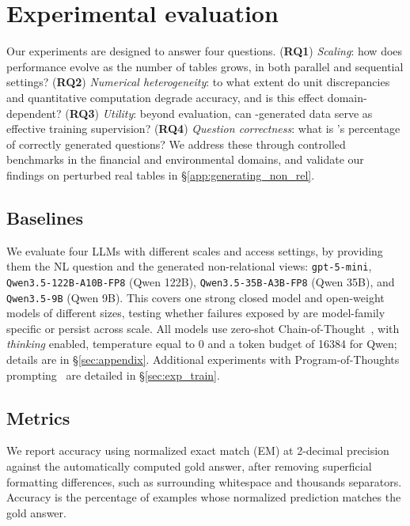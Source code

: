 \section{Experimental evaluation} 
Our experiments are designed to answer four questions. (\textbf{RQ1}) \emph{Scaling}: how does performance evolve as the number of tables grows, in both parallel and sequential settings? (\textbf{RQ2}) \emph{Numerical heterogeneity}: to what extent do unit discrepancies and quantitative computation degrade accuracy, and is this effect domain-dependent? (\textbf{RQ3}) \emph{Utility}: beyond evaluation, can \name{}-generated data serve as effective training supervision? (\textbf{RQ4}) \emph{Question correctness}: what is \name{}'s percentage of correctly generated questions?
We address these through controlled benchmarks in the financial and environmental domains, and validate our findings on perturbed real tables in \S\ref{app:generating_non_rel}.
\subsection{Baselines}
We evaluate four LLMs with different scales and access settings, by providing them the NL question and the generated non-relational views:
\texttt{gpt-5-mini}, \texttt{Qwen3.5-122B-A10B-FP8} (Qwen 122B),
\texttt{Qwen3.5-35B-A3B-FP8} (Qwen 35B), and \texttt{Qwen3.5-9B} (Qwen 9B).
This covers one strong closed model and open-weight models of different sizes, testing whether failures exposed by \name are model-family specific or persist across scale.
All models use zero-shot Chain-of-Thought~\cite{cot}, with \emph{thinking} enabled, temperature equal to 0 and a token budget of 16384 for Qwen; details are in \S\ref{sec:appendix}. Additional experiments with Program-of-Thoughts prompting~\cite{pot} are detailed in \S\ref{sec:exp_train}.
\subsection{Metrics}
\label{sec:metrics}
We report accuracy using normalized exact match (EM) at 2-decimal precision against the automatically computed gold answer, after removing superficial formatting differences, such as surrounding whitespace and thousands separators. Accuracy is the percentage of examples whose normalized prediction matches the gold answer.
